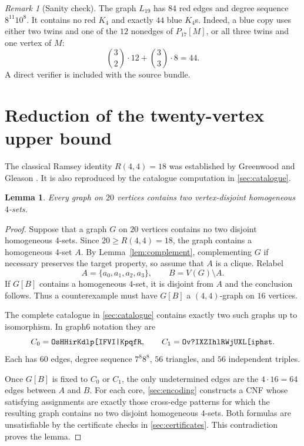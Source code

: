 \documentclass[11pt,a4paper]{article}
\newtheorem{lemma}[theorem]{Lemma}
\theoremstyle{definition}
\theoremstyle{remark}
\newtheorem{remark}[theorem]{Remark}
\newcommand{\corezero}{\texttt{\detokenize{OsHHirKdlp[IFVI|KpqfR}}}
\newcommand{\coreone}{\texttt{\detokenize{Ov?IXZIhlRWjUXL[iphst}}}
\begin{document}
\begin{remark}[Sanity check]\label{rem:lower-count}
The graph \(L_{19}\) has \(84\) red edges and degree sequence
\(8^{11}10^8\).  It contains no red \(K_4\) and exactly \(44\) blue
\(K_4\)s.  Indeed, a blue copy uses either two twins and one of the
\(12\) nonedges of \(P_{17}[M]\), or all three twins and one vertex of
\(M\):
\[
  \binom32\!\cdot12+\binom33\!\cdot8=44.
\]
A direct verifier is included with the source bundle.
\end{remark}

\section{Reduction of the twenty-vertex upper bound}

The classical Ramsey identity \(R(4,4)=18\) was established by Greenwood
and Gleason \cite{greenwood-gleason}.  It is also reproduced by the
catalogue computation in \cref{sec:catalogue}.

\begin{lemma}\label{lem:two-homfour}
Every graph on \(20\) vertices contains two vertex-disjoint homogeneous
\(4\)-sets.
\end{lemma}

\begin{proof}
Suppose that a graph \(G\) on \(20\) vertices contains no two disjoint
homogeneous \(4\)-sets.  Since \(20\geq R(4,4)=18\), the graph contains a
homogeneous \(4\)-set \(A\).  By Lemma~\ref{lem:complement}, complementing
\(G\) if necessary preserves the target property, so assume that \(A\)
is a clique.  Relabel
\[
  A=\{a_0,a_1,a_2,a_3\},
  \qquad B=V(G)\setminus A.
\]
If \(G[B]\) contains a homogeneous \(4\)-set, it is disjoint from \(A\)
and the conclusion follows.  Thus a counterexample must have \(G[B]\) a
\((4,4)\)-graph on \(16\) vertices.

The complete catalogue in \cref{sec:catalogue} contains exactly two such
graphs up to isomorphism.  In graph6 notation they are
\[
  C_0=\corezero,
  \qquad
  C_1=\coreone.
\]
Each has \(60\) edges, degree sequence \(7^8 8^8\), \(56\) triangles,
and \(56\) independent triples.

Once \(G[B]\) is fixed to \(C_0\) or \(C_1\), the only undetermined edges
are the \(4\cdot16=64\) edges between \(A\) and \(B\).  For each core,
\cref{sec:encoding} constructs a CNF whose satisfying assignments are
exactly those cross-edge patterns for which the resulting graph contains
no two disjoint homogeneous \(4\)-sets.  Both formulas are unsatisfiable
by the certificate checks in \cref{sec:certificates}.  This contradiction
proves the lemma.
\end{proof}
\end{document}
